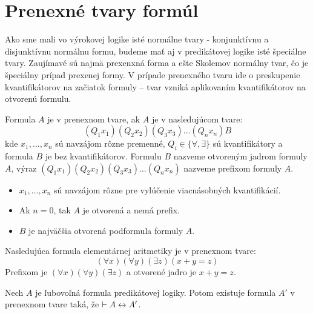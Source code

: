 
\section{Prenexné tvary formúl}

Ako sme mali vo výrokovej logike isté normálne tvary - konjunktívnu a
disjunktívnu normálnu formu, budeme mať aj v predikátovej logike isté
špeciálne tvary. Zaujímavé sú najmä prexenxná forma a ešte Skolemov
normálny tvar, čo je špeciálny prípad prexenej formy.
V prípade prenexného tvaru ide o preskupenie kvantifikátorov na
začiatok formuly -- tvar vzniká aplikovaním kvantifikátorov na otvorenú
formulu.


\begin{definicia}
    Formula $A$ je v prenexnom tvare, ak $A$ je v nasledujúcom tvare:
    \begin{equation*}
     (Q_1 x_1) (Q_2 x_2) (Q_3 x_3) \dots (Q_n x_n) B
    \end{equation*}
    kde $x_1, \dots , x_n$ sú navzájom rôzne premenné,
    $Q_i \in\{\forall, \exists\}$ sú
    kvantifikátory a  formula $B$ je bez kvantifikátorov.
    Formulu $B$ nazveme otvoreným jadrom formuly $A$, 
    výraz $(Q_1 x_1) (Q_2 x_2) (Q_3 x_3) \dots (Q_n x_n)$ nazveme
    prefixom formuly $A$.
\end{definicia}

\begin{poznamka}
    \noindent
    \begin{itemize}
     \item $x_1, \dots, x_n$ sú navzájom rôzne pre vylúčenie viacnásobných
        kvantifikácií.
     \item Ak $n=0$, tak $A$ je otvorená a nemá prefix.
     \item $B$ je najväčšia otvorená podformula formuly $A$.
    \end{itemize}
\end{poznamka}

\begin{priklad}
    Nasledujúca formula elementárnej aritmetiky je v prenexnom tvare:
    \begin{equation*}
        (\forall x) (\forall y) (\exists z) (x+y=z)
    \end{equation*}
    Prefixom je $(\forall x)(\forall y)(\exists z)$ a otvorené jadro
    je $x+y=z$.
\end{priklad}

\begin{veta}
 Nech $A$ je ľubovoľná formula predikátovej logiky. Potom existuje
 formula $A'$ v prenexnom tvare taká, že
 $\vdash A \leftrightarrow A'$.
 \label{veta:prenex}
\end{veta}

